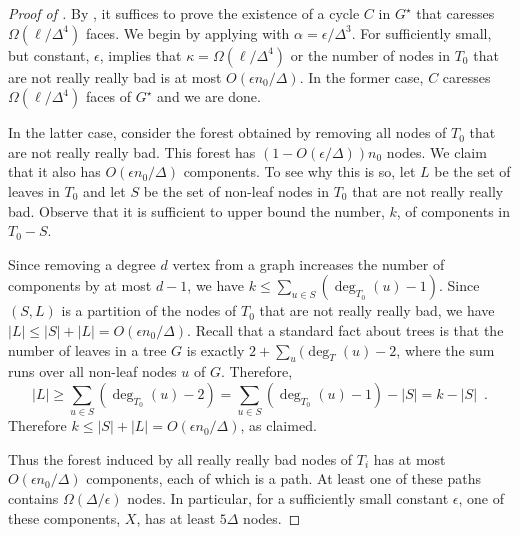 \documentclass{patmorin}
\newcommand{\dual}[1]{{#1}^\star}
\begin{document}
\begin{proof}[Proof of ]
By , it suffices to prove the existence of a cycle $C$ in $\dual{G}$ that caresses $\Omega(\ell/\Delta^4)$ faces.  We begin by applying  with $\alpha = \epsilon/\Delta^3$.  For sufficiently small, but constant, $\epsilon$,  implies that $\kappa = \Omega(\ell/\Delta^4)$ or the number of nodes in $T_0$ that are not really really bad is at most $O(\epsilon n_0/\Delta)$.  In the former case, $C$ caresses $\Omega(\ell/\Delta^4)$ faces of $\dual{G}$ and we are done.

In the latter case, consider the forest obtained by removing all nodes of $T_0$ that are not really really bad.  This forest has $(1-O(\epsilon/\Delta))n_0$ nodes.  We claim that it also has $O(\epsilon n_0/\Delta)$ components.  To see why this is so, let $L$ be the set of leaves in $T_0$ and let $S$ be the set of non-leaf nodes in $T_0$ that are not really really bad.  Observe that it is sufficient to upper bound the number, $k$, of components in $T_0-S$.

Since removing a degree $d$ vertex from a graph increases the number of components by at most $d-1$, we have $k \le \sum_{u\in S}(\deg_{T_0}(u)-1)$. Since $(S,L)$ is a partition of the nodes of $T_0$ that are not really really bad, we have $|L|\le |S|+|L|=  O(\epsilon n_0/\Delta)$.  Recall that a standard fact about trees is that the number of leaves in a tree $G$ is exactly $2+\sum_{u}(\deg_T(u)-2$, where the sum runs over all non-leaf nodes $u$ of $G$. Therefore,
\[
    |L| \ge \sum_{u\in S}(\deg_{T_0}(u)-2)
     = \sum_{u\in S}(\deg_{T_0}(u)-1) - |S| = k - |S|  \enspace .
\]
Therefore $k\le |S| + |L| = O(\epsilon n_0/\Delta)$, as claimed.

Thus the forest induced by all really really bad nodes of
$T_i$ has at most $O(\epsilon n_0/\Delta)$ components, each of which is
a path.  At least one of these paths contains $\Omega(\Delta/\epsilon)$
nodes. In particular, for a sufficiently small constant $\epsilon$,
one of these components, $X$, has at least $5\Delta$ nodes.



\end{proof}
\end{document}
